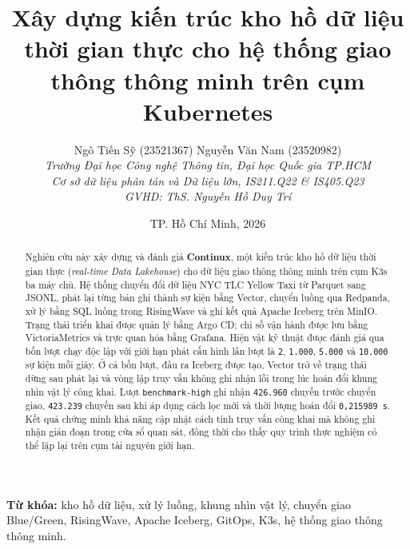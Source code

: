 \title{\Large\textbf{Xây dựng kiến trúc kho hồ dữ liệu thời gian thực cho hệ thống giao thông thông minh trên cụm Kubernetes}}
\author{
    Ngô Tiến Sỹ (23521367) \quad Nguyễn Văn Nam (23520982) \\[0.5em]
    \fontsize{10pt}{11pt}\selectfont \textit{Trường Đại học Công nghệ Thông tin, Đại học Quốc gia TP.HCM} \\
    \fontsize{10pt}{11pt}\selectfont \textit{Cơ sở dữ liệu phân tán và Dữ liệu lớn, IS211.Q22 \& IS405.Q23} \\
    \fontsize{10pt}{11pt}\selectfont \textit{GVHD: ThS. Nguyễn Hồ Duy Trí}
}
\date{TP. Hồ Chí Minh, 2026}

\maketitle

\begin{abstract}
Nghiên cứu này xây dựng và đánh giá \textbf{Continux}, một kiến trúc kho hồ dữ liệu thời gian thực (\emph{real-time Data Lakehouse}) cho dữ liệu giao thông thông minh trên cụm K3s ba máy chủ. Hệ thống chuyển đổi dữ liệu NYC TLC Yellow Taxi từ Parquet sang JSONL, phát lại từng bản ghi thành sự kiện bằng Vector, chuyển luồng qua Redpanda, xử lý bằng SQL luồng trong RisingWave và ghi kết quả Apache Iceberg trên MinIO. Trạng thái triển khai được quản lý bằng Argo CD; chỉ số vận hành được lưu bằng VictoriaMetrics và trực quan hóa bằng Grafana. Hiện vật kỹ thuật được đánh giá qua bốn lượt chạy độc lập với giới hạn phát cấu hình lần lượt là \texttt{2}, \texttt{1.000}, \texttt{5.000} và \texttt{10.000} sự kiện mỗi giây. Ở cả bốn lượt, đầu ra Iceberg được tạo, Vector trở về trạng thái dừng sau phát lại và vòng lặp truy vấn không ghi nhận lỗi trong lúc hoán đổi khung nhìn vật lý công khai. Lượt \texttt{benchmark-high} ghi nhận \texttt{426.960} chuyến trước chuyển giao, \texttt{423.239} chuyến sau khi áp dụng cách lọc mới và thời lượng hoán đổi \texttt{0,215989 s}. Kết quả chứng minh khả năng cập nhật cách tính truy vấn công khai mà không ghi nhận gián đoạn trong cửa sổ quan sát, đồng thời cho thấy quy trình thực nghiệm có thể lặp lại trên cụm tài nguyên giới hạn.
\end{abstract}

\noindent\textbf{Từ khóa:} kho hồ dữ liệu, xử lý luồng, khung nhìn vật lý, chuyển giao Blue/Green, RisingWave, Apache Iceberg, GitOps, K3s, hệ thống giao thông thông minh.
